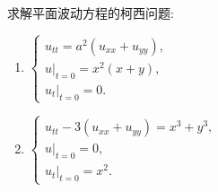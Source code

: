 \begin{exercise}
  求解平面波动方程的柯西问题:
  \begin{enumerate}[(1)]
    \item $\begin{cases}
            u_{tt} = a^2(u_{xx}+u_{yy}), \\
            u|_{t=0}=x^2(x+y), \\
            u_t|_{t=0}=0.
          \end{cases}$
    \item $\begin{cases}
            u_{tt} - 3(u_{xx}+u_{yy}) = x^3+y^3, \\
            u|_{t=0}=0, \\
            u_t|_{t=0}=x^2.
          \end{cases}$
  \end{enumerate}
\end{exercise}

